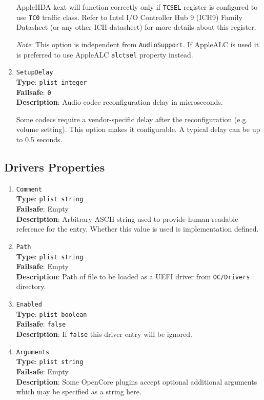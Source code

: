 \documentclass[]{article}
\begin{document}
\begin{enumerate}
  AppleHDA kext will function correctly only if \texttt{TCSEL} register is configured
  to use \texttt{TC0} traffic class. Refer to Intel I/O Controller Hub 9 (ICH9) Family
  Datasheet (or any other ICH datasheet) for more details about this register.

  \emph{Note}: This option is independent from \texttt{AudioSupport}. If AppleALC is used
  it is preferred to use AppleALC \texttt{alctsel} property instead.

\item
  \texttt{SetupDelay}\\
  \textbf{Type}: \texttt{plist\ integer}\\
  \textbf{Failsafe}: \texttt{0}\\
  \textbf{Description}: Audio codec reconfiguration delay in microseconds.

  Some codecs require a vendor-specific delay after the reconfiguration
  (e.g. volume setting). This option makes it configurable. A typical
  delay can be up to 0.5 seconds.

\end{enumerate}

\subsection{Drivers Properties}\label{uefidriversprops}

\begin{enumerate}

\item
  \texttt{Comment}\\
  \textbf{Type}: \texttt{plist\ string}\\
  \textbf{Failsafe}: Empty\\
  \textbf{Description}: Arbitrary ASCII string used to provide human readable
  reference for the entry. Whether this value is used is implementation defined.

\item
  \texttt{Path}\\
  \textbf{Type}: \texttt{plist\ string}\\
  \textbf{Failsafe}: Empty\\
  \textbf{Description}: Path of file to be loaded as a UEFI driver
  from \texttt{OC/Drivers} directory.

\item
  \texttt{Enabled}\\
  \textbf{Type}: \texttt{plist\ boolean}\\
  \textbf{Failsafe}: \texttt{false}\\
  \textbf{Description}: If \texttt{false} this driver entry will be ignored.

\item
  \texttt{Arguments}\\
  \textbf{Type}: \texttt{plist\ string}\\
  \textbf{Failsafe}: Empty\\
  \textbf{Description}: Some OpenCore plugins accept optional additional arguments
  which may be specified as a string here.

\end{enumerate}
\end{document}
